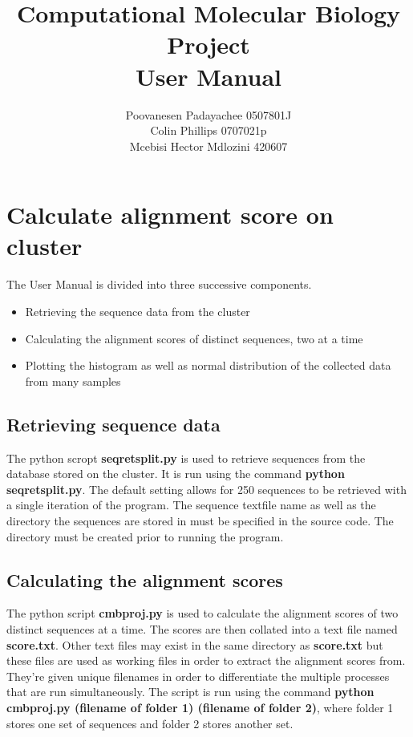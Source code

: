 \documentclass{article}
\begin{document}
\title{Computational Molecular Biology Project\\User Manual}
\author{Poovanesen Padayachee 0507801J\\Colin Phillips 0707021p\\Mcebisi Hector Mdlozini 420607}

\maketitle
\newpage


\section{Calculate alignment score on cluster}
The User Manual is divided into three successive components. 
\begin{itemize}
\item{Retrieving the sequence data from the cluster}
\item{Calculating the alignment scores of distinct sequences, two at a time}
\item{Plotting the histogram as well as normal distribution of the collected data from many samples}
\end{itemize}

\subsection{Retrieving sequence data}
The python scropt \textbf{seqretsplit.py} is used to retrieve sequences from the database stored on the cluster. It is run using the command \textbf{python seqretsplit.py}. The default setting allows for 250 sequences to be retrieved with a single iteration of the program. The sequence textfile name as well as the directory the sequences are stored in must be specified in the source code. The directory must be created prior to running the program.

\subsection{Calculating the alignment scores}
The python script \textbf{cmbproj.py} is used to calculate the alignment scores of two distinct sequences at a time. The scores are then collated into a text file named \textbf{score.txt}. Other text files may exist in the same directory as \textbf{score.txt} but these files are used as working files in order to extract the alignment scores from. They're given unique filenames in order to differentiate the multiple processes that are run simultaneously. The script is run using the command \textbf{python cmbproj.py (filename of folder 1) (filename of folder 2)}, where folder 1 stores one set of sequences and folder 2 stores another set.
\end{document}
